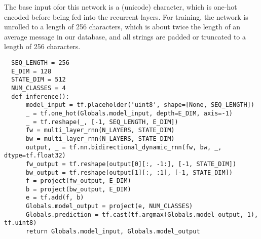 \documentclass[10pt]{amsart}
\newcommand{\x}{\mathbf{x}}
\theoremstyle{definition}
\begin{document}


The base input ofor this network is a (unicode) character, which is one-hot encoded before being fed into the
 recurrent layers.  For training, the network is unrolled to a length of 256 characters,
 which is about twice the length  of an average message in our database, and all strings are padded or truncated
 to a length of 256 characters.


\begin{verbatim}
  SEQ_LENGTH = 256
  E_DIM = 128
  STATE_DIM = 512
  NUM_CLASSES = 4
  def inference():
      model_input = tf.placeholder('uint8', shape=[None, SEQ_LENGTH])
      _ = tf.one_hot(Globals.model_input, depth=E_DIM, axis=-1)
      _ = tf.reshape(_, [-1, SEQ_LENGTH, E_DIM])
      fw = multi_layer_rnn(N_LAYERS, STATE_DIM)
      bw = multi_layer_rnn(N_LAYERS, STATE_DIM)
      output, _ = tf.nn.bidirectional_dynamic_rnn(fw, bw, _, dtype=tf.float32)
      fw_output = tf.reshape(output[0][:, -1:], [-1, STATE_DIM])
      bw_output = tf.reshape(output[1][:, :1], [-1, STATE_DIM])
      f = project(fw_output, E_DIM)
      b = project(bw_output, E_DIM)
      e = tf.add(f, b)
      Globals.model_output = project(e, NUM_CLASSES)
      Globals.prediction = tf.cast(tf.argmax(Globals.model_output, 1), tf.uint8)
      return Globals.model_input, Globals.model_output
\end{verbatim}

\end{document}
